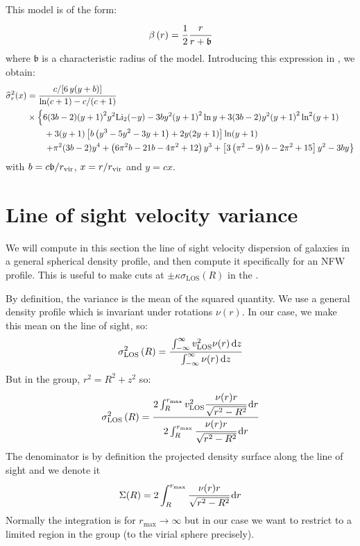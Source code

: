 This model is of the form:
%
\begin{equation}
    \beta \left(r\right) = \frac{1}{2}\cfrac{r}{r+\mathfrak{b}}
\end{equation}
%
where $\mathfrak{b}$ is a characteristic radius of the model. Introducing this
expression in , we obtain:
%
\begin{align}
    \widehat\sigma_r^2(x) &=
    \cfrac{c/[6\,y(y+b)]}{\ln (c+1)-c/(c+1)} \nonumber \\
    & \times \left\{
    6 (3b-2) {(y+1)}^2 y^2 {\rm Li}_2(-y)
    - 3 by^2{(y+1)}^2 \ln y
    +3(3b-2)y^2{(y+1)}^2 \ln^2(y+1) \right. \nonumber \\
    & \quad\quad
    +3(y+1) \left[b \left(y^3-5 y^2-3 y+1\right)+2 y (2 y+1)\right] \ln (y+1)
        \nonumber \\
    & \quad\quad
    \left. +\pi ^2 (3 b-2) y^4+\left(6 \pi ^2 b-21 b-4 \pi ^2+12\right)
       y^3+\left[3 \left(\pi ^2-9\right) b-2 \pi ^2+15\right] y^2
    - 3 by \right\}
\end{align}
%
with $b=c\mathfrak{b}/r_{\rm vir}$, $x=r/r_{\rm vir}$ and $y=cx$.

\section{Line of sight velocity variance}

We will compute in this section the line of sight velocity dispersion of
galaxies in a general spherical density profile, and then compute it
specifically for an NFW profile. This is useful to make cuts at
$\pm\kappa\sigma_\mathrm{LOS} \left(R\right)$ in the \pps{}.

By definition, the variance is the mean of the squared quantity. We use a
general density profile which is invariant under rotations $\nu{(r)}$. In our
case, we make this mean on the line of sight, so:
%
\begin{equation}
    \sigma_\mathrm{LOS}^2\left({R}\right)=
    \cfrac{\int_{-\infty}^{\infty}{v_\mathrm{LOS}^2}\nu{(r)}\,{\rm{d}}{z}}
    {\int_{-\infty}^{\infty}\nu{(r)}\,{\rm{d}}{z}}
\end{equation}
%
But in the group, $r^2=R^2+z^2$ so:
%
\begin{equation}
    \sigma_\mathrm{LOS}^2\left({R}\right)=
    \cfrac{2\int_{R}^{r_{\max}}{v_\mathrm{LOS}^2}
    \cfrac{\nu{(r)}{r}}{\sqrt{r^2-R^2}}\,{\rm{d}}{r}}
    {2\int_{R}^{r_{\max}}\cfrac{\nu{(r)}{r}}{\sqrt{r^2-R^2}}\,{\rm{d}}{r}}
\end{equation}
%
The denominator is by definition the projected density surface along the line
of sight and we denote it
%
\begin{equation}
    \Sigma(R) = 2\int_{R}^{r_{\max}}\cfrac{\nu{(r)}{r}}{\sqrt{r^2-R^2}}\,{\rm{d}}{r}
\end{equation}
%
Normally the integration is for $r_{\max}\rightarrow\infty$ but in our case we
want to restrict to a limited region in the group (to the virial sphere
precisely).

